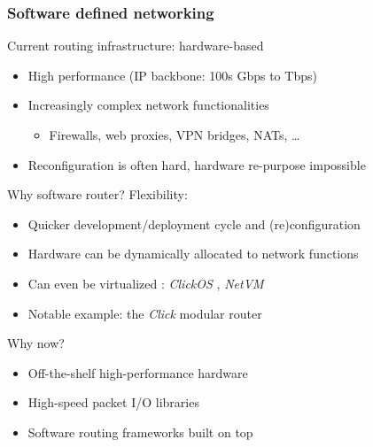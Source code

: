 \begin{frame}[fragile]
  \frametitle{Software defined networking}
  Current routing infrastructure: hardware-based
  \begin{itemize}
    \item High performance (IP backbone: 100s Gbps to Tbps)
    \item Increasingly complex network functionalities %
      \begin{itemize}
        \item Firewalls, web proxies, VPN bridges, NATs, \dots
      \end{itemize}
    \item Reconfiguration is often hard, hardware re-purpose impossible
  \end{itemize}
  Why software router? Flexibility:
  \begin{itemize}
    \item Quicker development/deployment cycle and (re)configuration
    \item Hardware can be dynamically allocated to network functions
    \item Can even be virtualized%
      : \textit{ClickOS} \cite{clickos}, \textit{NetVM} \cite{netvm}
    \item Notable example: the \textit{Click} modular router \cite{click}
  \end{itemize}
  Why now?
  \begin{itemize}
    \item Off-the-shelf high-performance hardware
    \item High-speed packet I/O libraries%
      \ \cite{dpdk,netmap}
    \item Software routing frameworks built on top \cite{fastclick,nba}
  \end{itemize}
\end{frame}

\extraslidesend



              
